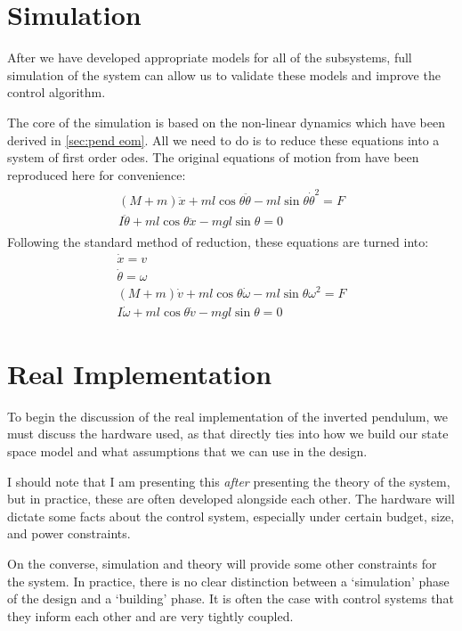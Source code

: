 \section{Simulation}\label{sec:sim}
After we have developed appropriate models for all of the subsystems, full simulation of the system can allow us to validate these models and improve the control algorithm. 

The core of the simulation is based on the non-linear dynamics which have been derived in \autoref{sec:pend eom}. All we need to do is to reduce these equations into a system of first order \glspl{ode}. The original equations of motion from  have been reproduced here for convenience:
\begin{gather}
\begin{array}{c}
     (M+m)\ddot{x}+ml\cos\theta\ddot{\theta}-ml\sin\theta\dot{\theta}^2=F \\I\ddot{\theta}+ml\cos\theta\ddot{x}-mgl\sin\theta=0
\end{array}
\end{gather}
Following the standard method of reduction, these equations are turned into:
\begin{gather}
    \dot{x}=v\\
    \dot{\theta}=\omega\\
         (M+m)\dot{v}+ml\cos\theta\dot{\omega}-ml\sin\theta\omega^2=F \\I\dot{\omega}+ml\cos\theta\dot{v}-mgl\sin\theta=0
\end{gather}

\section{Real Implementation}
To begin the discussion of the real implementation of the inverted pendulum, we must discuss the hardware used, as that directly ties into how we build our state space model and what assumptions that we can use in the design.

I should note that I am presenting this \textit{after} presenting the theory of the system, but in practice, these are often developed alongside each other. The hardware will dictate some facts about the control system, especially under certain budget, size, and power constraints.

On the converse, simulation and theory will provide some other constraints for the system. In practice, there is no clear distinction between a `simulation' phase of the design and a `building' phase. It is often the case with control systems that they inform each other and are very tightly coupled. 


